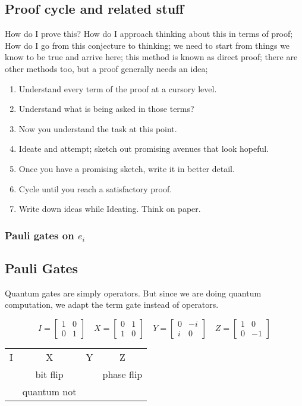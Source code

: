 \documentclass{article}
\begin{document}
\subsection*{Proof cycle and related stuff}

How do I prove this? How do I approach thinking about this in terms of proof; How do I go from this conjecture to thinking; we need to start from things we know to be true and arrive here; this method is known as direct proof; there are other methods too, but a proof generally needs an idea;
\begin{enumerate}
    \item Understand every term of the proof at a cursory level.
    \item Understand what is being asked in those terms?
    \item Now you understand the task at this point.
    \item Ideate and attempt; sketch out promising avenues that look hopeful.
    \item Once you have a promising sketch, write it in better detail.
    \item Cycle until you reach a satisfactory proof.
    \item Write down ideas while Ideating. Think on paper.
\end{enumerate}

\subsubsection{Pauli gates on $e_i$}

\subsection{Pauli Gates}
Quantum gates are simply operators. But since we are doing quantum computation, we adapt the term gate instead of operators.

\[
I = \begin{bmatrix} 1 & 0 \\ 0 & 1 \end{bmatrix} \quad
X = \begin{bmatrix} 0 & 1 \\ 1 & 0 \end{bmatrix} \quad
Y = \begin{bmatrix} 0 & -i \\ i & 0 \end{bmatrix} \quad
Z = \begin{bmatrix} 1 & 0 \\ 0 & -1 \end{bmatrix}
\]
\begin{center}
  \begin{tabular}{cccc}
I & X & Y & Z \\
  & bit flip    &   & phase flip \\
  & quantum not &   &            \\
\end{tabular}
\end{center}
\end{document}
